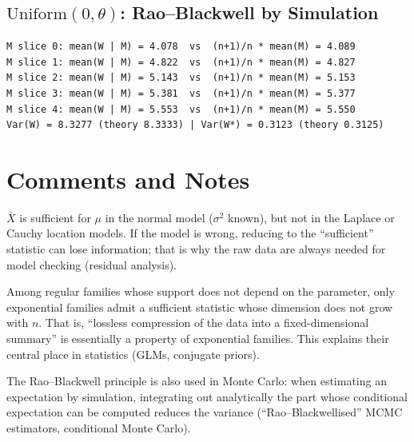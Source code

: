 \documentclass[main.tex]{subfiles}
\begin{document}
\subsection{$\text{Uniform}(0,\theta)$: Rao--Blackwell by Simulation}

\begin{lstlisting}[style=output]
M slice 0: mean(W | M) = 4.078  vs  (n+1)/n * mean(M) = 4.089
M slice 1: mean(W | M) = 4.822  vs  (n+1)/n * mean(M) = 4.827
M slice 2: mean(W | M) = 5.143  vs  (n+1)/n * mean(M) = 5.153
M slice 3: mean(W | M) = 5.381  vs  (n+1)/n * mean(M) = 5.377
M slice 4: mean(W | M) = 5.553  vs  (n+1)/n * mean(M) = 5.550
Var(W) = 8.3277 (theory 8.3333) | Var(W*) = 0.3123 (theory 0.3125)
\end{lstlisting}

\section{Comments and Notes}

\begin{remark}
$\bar X$ is sufficient for $\mu$ in the normal model ($\sigma^2$ known), but not in the Laplace or Cauchy location models. If the model is wrong, reducing to the ``sufficient'' statistic can lose information; that is why the raw data are always needed for model checking (residual analysis).
\end{remark}

\begin{remark}
Among regular families whose support does not depend on the parameter, only exponential families admit a sufficient statistic whose dimension does not grow with $n$. That is, ``lossless compression of the data into a fixed-dimensional summary'' is essentially a property of exponential families. This explains their central place in statistics (GLMs, conjugate priors).
\end{remark}

\begin{remark}
The Rao--Blackwell principle is also used in Monte Carlo: when estimating an expectation by simulation, integrating out analytically the part whose conditional expectation can be computed reduces the variance (``Rao--Blackwellised'' MCMC estimators, conditional Monte Carlo).
\end{remark}
\end{document}
